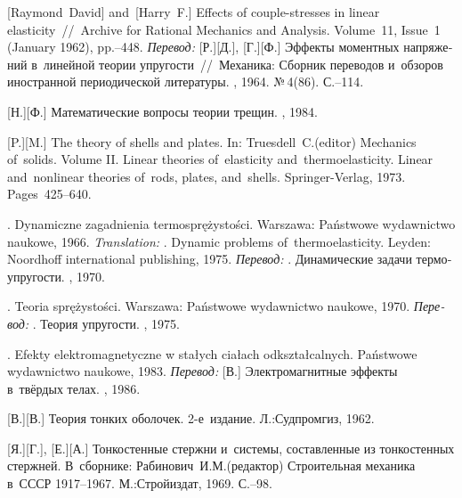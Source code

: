 \begin{thebibliography}{123}
\begin{otherlanguage}{russian}
[Raymond~David] %
and~[Harry~F.] %
Effects of couple-stresses in linear elasticity~//~Archive for Rational Mechanics and Analysis. Volume~11, Issue~1 (January 1962), pp.\hbox{--}448.
\emph{Перевод:}
[Р.][Д.], [Г.][Ф.]
Эффекты моментных напряжений в~линейной теории упругости~//~Механика: Сборник переводов и~обзоров иностранной периодической литературы. \mirpublisher, 1964. №\,4\:(86). С.\hbox{--}114.

[Н.][Ф.] Математические вопросы теории трещин. \naukapublisher, 1984. 

[P.][M.] The theory of shells and plates. In: Truesdell~C.\:(editor) Mechanics of~solids. Volume II. Linear theories of~elasticity and~thermoelasticity. Linear and~nonlinear theories of~rods, plates, and~shells. Springer\hbox{-}Verlag, 1973. Pages~425\hbox{--}640.

.
Dynamiczne zagadnienia termosprężystości.
Warsza\-wa: Państwowe wydawnictwo naukowe, 1966. 
\emph{Translation:}
.
Dynamic problems of~thermoelasticity.
Leyden: Noordhoff international publishing, 1975.
\emph{Перевод:}
.
Динамические задачи термоупругости.
\mirpublisher, 1970.

.
Teoria sprężystości.
Warszawa: Państwowe wy\-daw\-nic\-two naukowe, 1970. 
\emph{Перевод:}
.
Теория упругости.
\mirpublisher, 1975.

. Efekty elektromagnetyczne w stałych ciałach od\-kształ\-cal\-nych. Państwowe wydawnictwo naukowe, 1983. 
\emph{Перевод:}
[В.] Электромагнитные эффекты в~твёрдых телах. \mirpublisher, 1986. 

[В.][В.] Теория тонких оболочек. 2\hbox{-}е~издание. Л.:\;Судпромгиз, 1962. 

[Я.][Г.], [Е.][А.] Тонкостенные стержни и~системы, составленные из тонкостенных стержней. В~сборнике: Рабинович~И.\:М.\:(редактор) Строительная механика в~СССР 1917\hbox{--}1967. М.:\;Строй\-издат, 1969. С.\hbox{--}98.


\end{otherlanguage}
\end{thebibliography}
